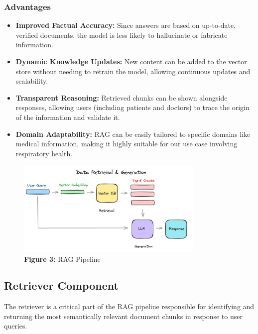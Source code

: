 \subsubsection*{Advantages}
\begin{itemize}
    \item \textbf{Improved Factual Accuracy:} Since answers are based on up-to-date, verified documents, the model is less likely to hallucinate or fabricate information.
    
    \item \textbf{Dynamic Knowledge Updates:} New content can be added to the vector store without needing to retrain the model, allowing continuous updates and scalability.
    
    \item \textbf{Transparent Reasoning:} Retrieved chunks can be shown alongside responses, allowing users (including patients and doctors) to trace the origin of the information and validate it.
    
    \item \textbf{Domain Adaptability:} RAG can be easily tailored to specific domains like medical information, making it highly suitable for our use case involving respiratory health.
\end{itemize}

\begin{figure}[htbp]
  \centering
  \includegraphics[width=0.8\textwidth]{images/Data_retrieval_and_generation_RAG.png}
  \caption*{\textbf{Figure 3:} RAG Pipeline} %
  \label{fig:indexing-process-manual}
\end{figure}

\subsection{Retriever Component}
\label{subsec:retriever}

The retriever is a critical part of the RAG pipeline responsible for identifying and returning the most semantically relevant document chunks in response to user queries.

